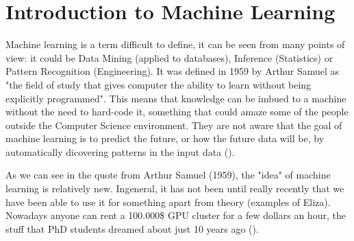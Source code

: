 

\section{Introduction to Machine Learning}
Machine learning is a term difficult to define, it can be seen from many points of view: it could be Data Mining (applied to databases), Inference (Statistics) or Pattern Recognition (Engineering). It was defined in 1959  by Arthur Samuel as "the field of study that gives computer the ability to learn without being explicitly programmed". This means that knowledge can be imbued to a machine without the need to hard-code it, something that could amaze some of the people outside the Computer Science environment. They are not aware that the goal of machine learning is to predict the future, or how the future data will be, by automatically dicovering patterns in the input data (\cite{kevin_p_murphy_book}). 

As we can see in the quote from Arthur Samuel (1959), the "idea" of machine learning is relatively new. Ingeneral, it has not been until really recently that we have been able to use it for something apart from theory (examples of Eliza). Nowadays anyone can rent a 100.000\$ GPU cluster for a few dollars an hour, the stuff that PhD students dreamed about just 10 years ago (\cite{pyhton_n_intro_to_ML}).  

